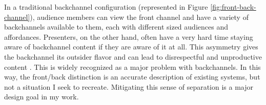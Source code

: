In a traditional backchannel configuration (represented in Figure \ref{fig:front-back-channel}), audience members can view the front channel and have a variety of backchannels available to them, each with different sized audiences and affordances. Presenters, on the other hand, often have a very hard time staying aware of backchannel content if they are aware of it at all. This asymmetry gives the backchannel its outsider flavor and can lead to disrespectful and unproductive content \citep{boyd:Yo36SNyj}. This is widely recognized as a major problem with backchannels. In this way, the front/back distinction is an accurate description of existing systems, but not a situation I seek to recreate.  Mitigating this sense of separation is a major design goal in my work.









